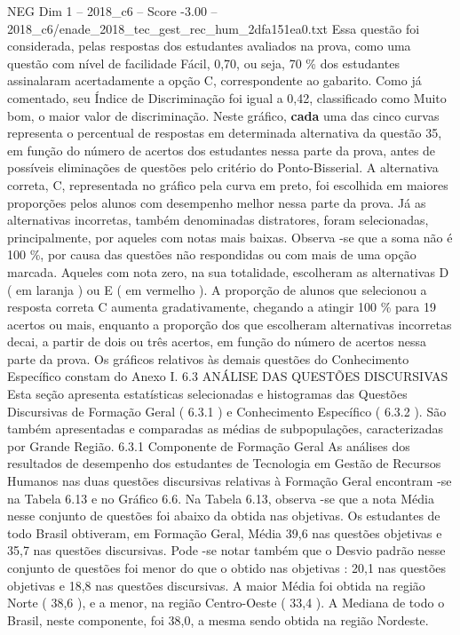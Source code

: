 \begin{textsample}{NEG Dim 1 – 2018\_c6 – Score -3.00 – 2018\_c6/enade\_2018\_tec\_gest\_rec\_hum\_2dfa151ea0.txt}
Essa questão foi considerada, pelas respostas dos estudantes avaliados na prova, como uma questão com nível de facilidade Fácil, 0,70, ou seja, 70 \% dos estudantes assinalaram acertadamente a opção C, correspondente ao gabarito.
Como já comentado, seu Índice de Discriminação foi igual a 0,42, classificado como Muito bom, o maior valor de discriminação.
Neste gráfico, \textbf{cada} uma das cinco curvas representa o percentual de respostas em determinada alternativa da questão 35, em função do número de acertos dos estudantes nessa parte da prova, antes de possíveis eliminações de questões pelo critério do Ponto-Bisserial.
A alternativa correta, C, representada no gráfico pela curva em preto, foi escolhida em maiores proporções pelos alunos com desempenho melhor nessa parte da prova.
Já as alternativas incorretas, também denominadas distratores, foram selecionadas, principalmente, por aqueles com notas mais baixas.
Observa -se que a soma não é 100 \%, por causa das questões não respondidas ou com mais de uma opção marcada.
Aqueles com nota zero, na sua totalidade, escolheram as alternativas D ( em laranja ) ou E ( em vermelho ).
A proporção de alunos que selecionou a resposta correta C aumenta gradativamente, chegando a atingir 100 \% para 19 acertos ou mais, enquanto a proporção dos que escolheram alternativas incorretas decai, a partir de dois ou três acertos, em função do número de acertos nessa parte da prova.
Os gráficos relativos às demais questões do Conhecimento Específico constam do Anexo I. 6.3 ANÁLISE DAS QUESTÕES DISCURSIVAS Esta seção apresenta estatísticas selecionadas e histogramas das Questões Discursivas de Formação Geral ( 6.3.1 ) e Conhecimento Específico ( 6.3.2 ).
São também apresentadas e comparadas as médias de subpopulações, caracterizadas por Grande Região. 6.3.1 Componente de Formação Geral As análises dos resultados de desempenho dos estudantes de Tecnologia em Gestão de Recursos Humanos nas duas questões discursivas relativas à Formação Geral encontram -se na Tabela 6.13 e no Gráfico 6.6.
Na Tabela 6.13, observa -se que a nota Média nesse conjunto de questões foi abaixo da obtida nas objetivas.
Os estudantes de todo Brasil obtiveram, em Formação Geral, Média 39,6 nas questões objetivas e 35,7 nas questões discursivas.
Pode -se notar também que o Desvio padrão nesse conjunto de questões foi menor do que o obtido nas objetivas : 20,1 nas questões objetivas e 18,8 nas questões discursivas.
A maior Média foi obtida na região Norte ( 38,6 ), e a menor, na região Centro-Oeste ( 33,4 ).
A Mediana de todo o Brasil, neste componente, foi 38,0, a mesma sendo obtida na região Nordeste.

\end{textsample}

